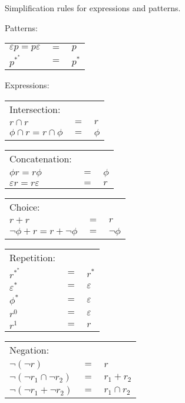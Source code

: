 \begin{defn}[Simplification]
   \label{defn-simplify}
   Simplification rules for expressions and patterns.

   Patterns:

   \begin{tabular}{lrl}
      $\varepsilon p = p \varepsilon$	& $=$	& $p$				\\
      $p^{*^*}$				& $=$	& $p^*$				\\
   \end{tabular}

   \needspace{3cm}
   Expressions:

   \begin{tabular}{lrl}
      Intersection:								\\
      $r \cap r$			& $=$	& $r$				\\
      $\phi \cap r = r \cap \phi$	& $=$	& $\phi$			\\
   \end{tabular}

   \begin{tabular}{lrl}
      Concatenation:								\\
      $\phi r = r \phi$			& $=$	& $\phi$			\\
      $\varepsilon r = r \varepsilon$	& $=$	& $r$				\\
   \end{tabular}

   \begin{tabular}{lrl}
      Choice:									\\
      $r + r$				& $=$	& $r$				\\
      $\neg\phi + r = r + \neg\phi$	& $=$	& $\neg\phi$			\\
   \end{tabular}

   \begin{tabular}{lrl}
      Repetition:								\\
      $r^{*^*}$				& $=$	& $r^*$				\\
      $\varepsilon^*$			& $=$	& $\varepsilon$			\\
      $\phi^*$				& $=$	& $\varepsilon$			\\
      $r^0$				& $=$	& $\varepsilon$			\\
      $r^1$				& $=$	& $r$				\\
   \end{tabular}

   \needspace{2cm}
   \begin{tabular}{lrl}
      Negation:									\\
      $\neg(\neg r)$			& $=$	& $r$				\\
      $\neg(\neg r_1 \cap \neg r_2)$	& $=$	& $r_1 + r_2$			\\
      $\neg(\neg r_1 + \neg r_2)$	& $=$	& $r_1 \cap r_2$		\\
   \end{tabular}
\end{defn}

